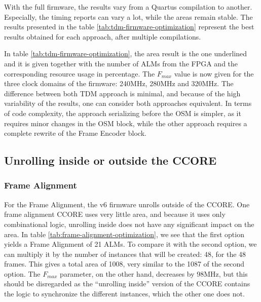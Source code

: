 \begin{itemize}
With the full firmware, the results vary from a Quartus compilation to another. Especially, the timing reports can vary a lot, while the areas remain stable. The results presented in the table \ref{tab:tdm-firmware-optimization} represent the best results obtained for each approach, after multiple compilations.

In table \ref{tab:tdm-firmware-optimization}, the area result is the one underlined and it is given together with the number of ALMs from the FPGA and the corresponding resource usage in percentage. The $F_{max}$ value is now given for the three clock domains of the firmware: 240MHz, 280MHz and 320MHz. The difference between both TDM approach is minimal, and because of the high variability of the results, one can consider both approaches equivalent. In terms of code complexity, the approach serializing before the OSM is simpler, as it requires minor changes in the OSM block, while the other approach requires a complete rewrite of the Frame Encoder block.



\subsection{Unrolling inside or outside the CCORE}


\subsubsection{Frame Alignment}

For the Frame Alignment, the v6 firmware unrolls outside of the CCORE. One frame alignment CCORE uses very little area, and because it uses only combinational logic, unrolling inside does not have any significant impact on the area. In table \ref{tab:frame-alignment-optimization}, we see that the first option yields a Frame Alignment of 21 ALMs. To compare it with the second option, we can multiply it by the number of instances that will be created: 48, for the 48 frames. This gives a total area of 1008, very similar to the 1087 of the second option. The \(F_{max}\) parameter, on the other hand, decreases by 98MHz, but this should be disregarded as the ``unrolling inside'' version of the CCORE contains the logic to synchronize the different instances, which the other one does not.


\end{itemize}
